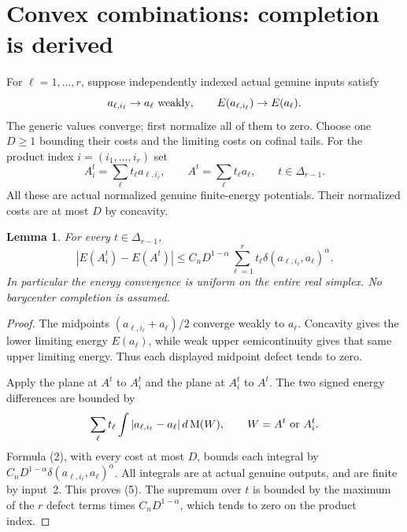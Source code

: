 \documentclass[11pt]{article}
\newtheorem{lemma}[theorem]{Lemma}
\newcommand{\MA}{\operatorname{M}}
\begin{document}
\section{Convex combinations: completion is derived}
For $\ell=1,\ldots,r$, suppose independently indexed
actual genuine inputs satisfy
\[
 a_{\ell,i_\ell}\to a_\ell\ \hbox{weakly},\qquad
 E(a_{\ell,i_\ell})\to E(a_\ell).
\]
The generic values converge; first normalize all of them
to zero. Choose one $D\geq1$ bounding their costs and
the limiting costs on cofinal tails.
For the product index $i=(i_1,\ldots,i_r)$ set
\[
 A_i^t=\sum_\ell t_\ell a_{\ell,i_\ell},\qquad
 A^t=\sum_\ell t_\ell a_\ell,\qquad t\in\Delta_{r-1}.
\]
All these are actual normalized genuine finite-energy
potentials. Their normalized costs are at most $D$ by concavity.

\begin{lemma}
For every $t\in\Delta_{r-1}$,
\[
 |E(A_i^t)-E(A^t)|
 \leq C_nD^{1-\alpha}
          \sum_{\ell=1}^r t_\ell
                \delta(a_{\ell,i_\ell},a_\ell)^\alpha.  \tag{5}
\]
In particular the energy convergence is uniform on the
entire real simplex. No barycenter completion is assumed.
\end{lemma}
\begin{proof}
The midpoints $(a_{\ell,i_\ell}+a_\ell)/2$ converge
weakly to $a_\ell$. Concavity gives the lower limiting
energy $E(a_\ell)$, while weak upper semicontinuity gives
that same upper limiting energy. Thus each displayed
midpoint defect tends to zero.

Apply the plane at $A^t$ to $A_i^t$ and the plane at
$A_i^t$ to $A^t$. The two signed energy differences
are bounded by
\[
 \sum_\ell t_\ell\int|a_{\ell,i_\ell}-a_\ell|\,d\MA(W),
                  \qquad W=A^t\ \hbox{or}\ A_i^t.
\]
Formula (2), with every cost at most $D$, bounds each
integral by
$C_nD^{1-\alpha}\delta(a_{\ell,i_\ell},a_\ell)^\alpha$.
All integrals are at actual genuine outputs, and are
finite by input~2. This proves (5).
The supremum over $t$ is bounded by the maximum of the
$r$ defect terms times $C_nD^{1-\alpha}$, which tends
to zero on the product index.
\end{proof}
\end{document}
